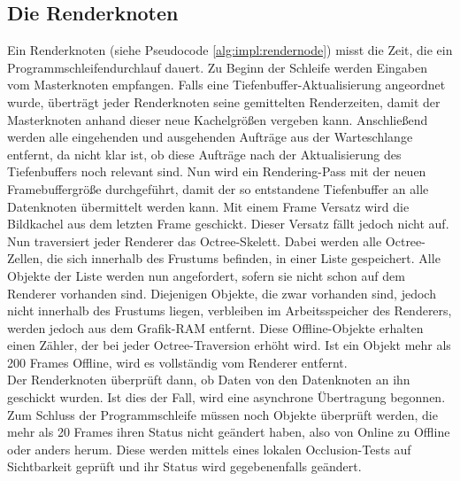 \subsection{Die Renderknoten}
\label{sec:impl:render}
Ein Renderknoten (siehe Pseudocode \ref{alg:impl:rendernode}) misst die Zeit, die ein Programmschleifendurchlauf dauert. Zu Beginn der Schleife werden Eingaben vom Masterknoten empfangen. Falls eine Tiefenbuffer-Aktualisierung angeordnet wurde, überträgt jeder Renderknoten seine gemittelten Renderzeiten, damit der Masterknoten anhand dieser neue Kachelgrößen vergeben kann. Anschließend werden alle eingehenden und ausgehenden Aufträge aus der Warteschlange entfernt, da nicht klar ist, ob diese Aufträge nach der Aktualisierung des Tiefenbuffers noch relevant sind. Nun wird ein Rendering-Pass mit der neuen Framebuffergröße durchgeführt, damit der so entstandene Tiefenbuffer an alle Datenknoten übermittelt werden kann. Mit einem Frame Versatz wird die Bildkachel aus dem letzten Frame geschickt. Dieser Versatz fällt jedoch nicht auf. Nun traversiert jeder Renderer das Octree-Skelett. Dabei werden alle Octree-Zellen, die sich innerhalb des Frustums befinden, in einer Liste gespeichert. Alle Objekte der Liste werden nun angefordert, sofern sie nicht schon auf dem Renderer vorhanden sind. Diejenigen Objekte, die zwar vorhanden sind, jedoch nicht innerhalb des Frustums liegen, verbleiben im Arbeitsspeicher des Renderers, werden jedoch aus dem Grafik-RAM entfernt. Diese Offline-Objekte erhalten einen Zähler, der bei jeder Octree-Traversion erhöht wird. Ist ein Objekt mehr als 200 Frames Offline, wird es vollständig vom Renderer entfernt.\\
Der Renderknoten überprüft dann, ob Daten von den Datenknoten an ihn geschickt wurden. Ist dies der Fall, wird eine asynchrone Übertragung begonnen. Zum Schluss der Programmschleife müssen noch Objekte überprüft werden, die mehr als 20 Frames ihren Status nicht geändert haben, also von Online zu Offline oder anders herum. Diese werden mittels eines lokalen Occlusion-Tests auf Sichtbarkeit geprüft und ihr Status wird gegebenenfalls geändert.
 
